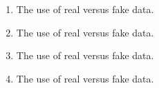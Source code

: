 \documentclass[11pt]{article}
\begin{document}
\begin{enumerate}
\item The use of real versus fake data. 
\begin{addmargin}[2em]{2em}
\end{addmargin}

\item The use of real versus fake data. 
\begin{addmargin}[2em]{2em}
\end{addmargin}


\item The use of real versus fake data. 
\begin{addmargin}[2em]{2em}
\end{addmargin}


\item The use of real versus fake data. 
\begin{addmargin}[2em]{2em}
\end{addmargin}






\end{enumerate}
\end{document}
